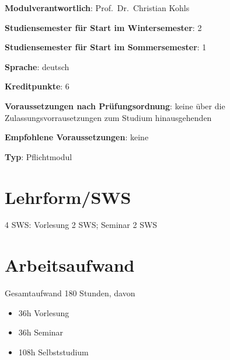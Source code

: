 \begin{modulHead}
\textbf{Modulverantwortlich}: Prof.~Dr.~Christian
Kohls
\end{modulHead}
\begin{modulHead}
\textbf{Studiensemester für
Start im Wintersemester}:
2
\end{modulHead}
\begin{modulHead}
\textbf{Studiensemester für Start
im Sommersemester}:
1
\end{modulHead}
\begin{modulHead}
\textbf{Sprache}:
deutsch
\end{modulHead}
\begin{modulHead}
\textbf{Kreditpunkte}:
6
\end{modulHead}
\begin{modulHead}
\textbf{Voraussetzungen nach
Prüfungsordnung}: keine über die Zulassungsvorrausetzungen zum Studium
hinausgehenden
\end{modulHead}
\begin{modulHead}
\textbf{Empfohlene
Voraussetzungen}: keine
\end{modulHead}
\begin{modulHead}
\textbf{Typ}:
Pflichtmodul
\end{modulHead}


\section*{Lehrform/SWS\label{/mi-2017/modulbeschreibungen-master/MA_All_Computerethik}}\label{lehrformswspathlabelmi-2017modulbeschreibungen-mastermaux5fallux5fcomputerethik}

4 SWS: Vorlesung 2 SWS; Seminar 2 SWS

\section*{Arbeitsaufwand\label{/mi-2017/modulbeschreibungen-master/MA_All_Computerethik}}\label{arbeitsaufwandpathlabelmi-2017modulbeschreibungen-mastermaux5fallux5fcomputerethik}

Gesamtaufwand 180 Stunden, davon

\begin{itemize}
\tightlist
\item
  36h Vorlesung
\item
  36h Seminar
\item
  108h Selbststudium
\end{itemize}

